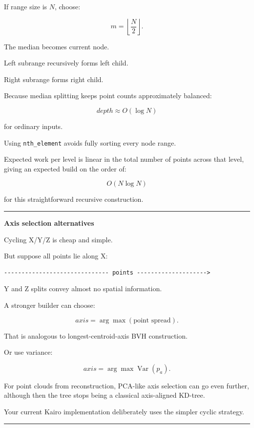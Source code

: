 If range size is \(N\), choose:

\[
m=\left\lfloor\frac N2\right\rfloor.
\]

The median becomes current node.

Left subrange recursively forms left child.

Right subrange forms right child.

Because median splitting keeps point counts approximately balanced:

\[
depth\approx O(\log N)
\]

for ordinary inputs.

Using \texttt{nth\_element} avoids fully sorting every node range.

Expected work per level is linear in the total number of points across that level, giving an expected build on the order of:

\[
O(N\log N)
\]

for this straightforward recursive construction.

\begin{center}\rule{0.5\linewidth}{0.5pt}\end{center}

\textbf{Axis selection alternatives}

Cycling X/Y/Z is cheap and simple.

But suppose all points lie along X:

\begin{verbatim}
------------------------------ points -------------------->
\end{verbatim}

Y and Z splits convey almost no spatial information.

A stronger builder can choose:

\[
axis=
\arg\max(
\text{point spread}
).
\]

That is analogous to longest-centroid-axis BVH construction.

Or use variance:

\[
axis=
\arg\max
\operatorname{Var}(p_a).
\]

For point clouds from reconstruction, PCA-like axis selection can go even further, although then the tree stops being a classical axis-aligned KD-tree.

Your current Kairo implementation deliberately uses the simpler cyclic strategy.

\begin{center}\rule{0.5\linewidth}{0.5pt}\end{center}

